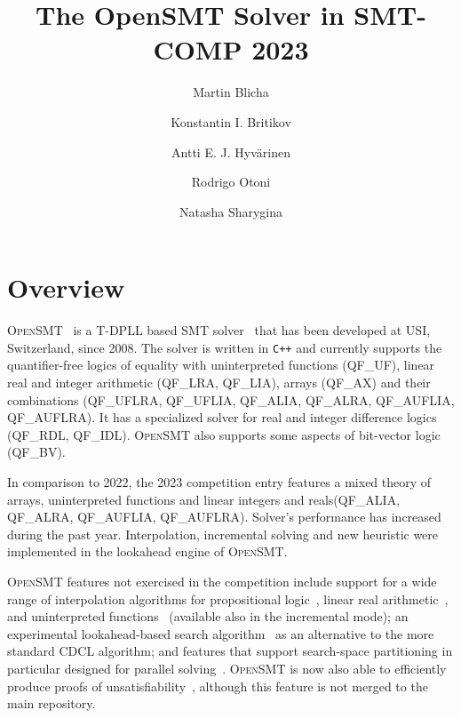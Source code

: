 \documentclass{easychair}
\title{The OpenSMT Solver in SMT-COMP 2023}
\author{
Martin Blicha \and
Konstantin I. Britikov \and
Antti E. J. Hyv{\"a}rinen \and
Rodrigo Otoni \and 
Natasha Sharygina \\
}
\institute{Universit{\`a} della Svizzera italiana (USI), Lugano,
Switzerland}
\date{}
\newcommand{\qflra}{QF\_LRA}
\newcommand{\qflia}{QF\_LIA}
\newcommand{\qfuf}{QF\_UF}
\newcommand{\qfbv}{QF\_BV}
\newcommand{\qfrdl}{QF\_RDL}
\newcommand{\qfidl}{QF\_IDL}
\newcommand{\qfuflra}{QF\_UFLRA}
\newcommand{\qfuflia}{QF\_UFLIA}
\newcommand{\qfax}{QF\_AX}
\newcommand{\qfauflia}{QF\_AUFLIA}
\newcommand{\qfauflra}{QF\_AUFLRA}
\newcommand{\qfalia}{QF\_ALIA}
\newcommand{\qfalra}{QF\_ALRA}
\newcommand{\opensmt}{\textsc{OpenSMT}\xspace}
\begin{document}
\maketitle

\section{Overview}

\opensmt~\cite{HyvarinenMAS16} is a T-DPLL based SMT
solver~\cite{NieuwenhuisOT:JACM06} that has been developed at USI,
Switzerland, since 2008.  The solver is written in {\tt C++} and
currently supports the quantifier-free logics of equality with
uninterpreted functions (\qfuf), linear real and integer arithmetic
(\qflra, \qflia), arrays (\qfax) and their combinations (\qfuflra, \qfuflia, \qfalia, \qfalra, \qfauflia, \qfauflra).
It has a specialized solver for real and integer difference logics (\qfrdl,
\qfidl). \opensmt also supports some aspects of bit-vector logic (\qfbv).

In comparison to 2022, the 2023 competition entry features a 
mixed theory of arrays, uninterpreted functions and linear integers and reals(\qfalia, \qfalra, \qfauflia, \qfauflra). Solver's performance has increased during the past year. 
Interpolation, incremental solving and new heuristic were implemented in the lookahead engine of \opensmt.

\opensmt features not exercised in the competition include support for a
wide range of interpolation algorithms for propositional
logic~\cite{AltFHS:VSTTE2015}, linear real
arithmetic~\cite{BlichaHKS19}, and uninterpreted
functions~\cite{AltHAS:FMCAD17} (available also in the incremental
mode); an experimental look\-ahead-based search
algorithm~\cite{HyvarinenMSCS18} as an alternative to the more standard
CDCL algorithm; and features that support search-space partitioning in
particular designed for parallel solving~\cite{HyvarinenMS:SAT15}.
\opensmt is now also able to efficiently produce proofs of
unsatisfiability~\cite{OtoniBEHS:DAC21}, although this feature is not merged to the main repository.

\iffalse %
\end{document}
